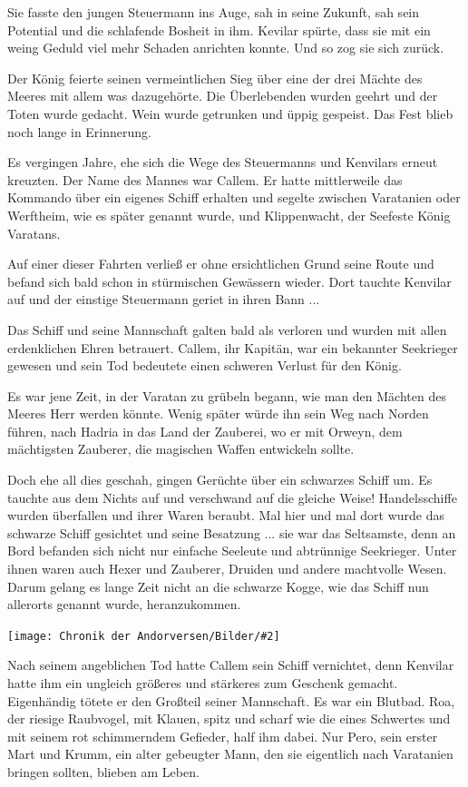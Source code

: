 \documentclass[10pt, a4paper, oneside]{book}
\newcommand{\bildmitts}[2][height=0.32\textwidth,width=0.48\textwidth,keepaspectratio]{%
    \begin{center}
        \texttt{[image: Chronik der Andorversen/Bilder/\#2]}
    \end{center}
}
\begin{document}
\begin{multicols}{2}
Sie fasste den jungen Steuermann ins Auge, sah in seine Zukunft, sah sein Potential und die schlafende Bosheit in ihm. Kevilar spürte, dass sie mit ein weing Geduld viel mehr Schaden anrichten konnte. Und so zog sie sich zurück.\bigskip

Der König feierte seinen vermeintlichen Sieg über eine der drei Mächte des Meeres mit allem was dazugehörte. Die Überlebenden wurden geehrt und der Toten wurde gedacht. Wein wurde getrunken und üppig gespeist. Das Fest blieb noch lange in Erinnerung.

Es vergingen Jahre, ehe sich die Wege des Steuermanns und Kenvilars erneut kreuzten.  Der Name des Mannes war Callem. Er hatte mittlerweile das Kommando über ein eigenes Schiff erhalten und segelte zwischen Varatanien oder Werftheim, wie es später genannt wurde, und Klippenwacht, der Seefeste König Varatans.\bigskip

Auf einer dieser Fahrten verließ er ohne ersichtlichen Grund seine Route und befand sich bald schon in stürmischen Gewässern wieder. Dort tauchte Kenvilar auf und der einstige Steuermann geriet in ihren Bann ...\bigskip

Das Schiff und seine Mannschaft galten bald als verloren und wurden mit allen erdenklichen Ehren betrauert. Callem, ihr Kapitän, war ein bekannter Seekrieger gewesen und sein Tod bedeutete einen schweren Verlust für den König.\bigskip

Es war jene Zeit, in der Varatan zu grübeln begann, wie man den Mächten des Meeres Herr werden könnte. Wenig später würde ihn sein Weg nach Norden führen, nach Hadria in das Land der Zauberei, wo er mit Orweyn, dem mächtigsten Zauberer, die magischen Waffen entwickeln sollte.\bigskip

Doch ehe all dies geschah, gingen Gerüchte über ein schwarzes Schiff um. Es tauchte aus dem Nichts auf und verschwand auf die gleiche Weise! Handelsschiffe wurden überfallen und ihrer Waren beraubt. Mal hier und mal dort wurde das schwarze Schiff gesichtet und seine Besatzung ...  sie war das Seltsamste, denn an Bord befanden sich nicht nur einfache Seeleute und abtrünnige Seekrieger. Unter ihnen waren auch Hexer und Zauberer, Druiden und andere machtvolle Wesen. Darum gelang es lange Zeit nicht an die schwarze Kogge, wie das Schiff nun allerorts genannt wurde, heranzukommen.

\bildmitts{Varatans Fluch Bild 1.jpg}

Nach seinem angeblichen Tod hatte Callem sein Schiff vernichtet, denn Kenvilar hatte ihm ein ungleich größeres und stärkeres zum Geschenk gemacht. Eigenhändig tötete er den Großteil seiner Mannschaft. Es war ein Blutbad. Roa, der riesige Raubvogel, mit Klauen, spitz und scharf wie die eines Schwertes und mit seinem rot schimmerndem Gefieder, half ihm dabei. Nur Pero, sein erster Mart und Krumm, ein alter gebeugter Mann, den sie eigentlich nach Varatanien bringen sollten, blieben am Leben.\bigskip


\end{multicols}
\end{document}
